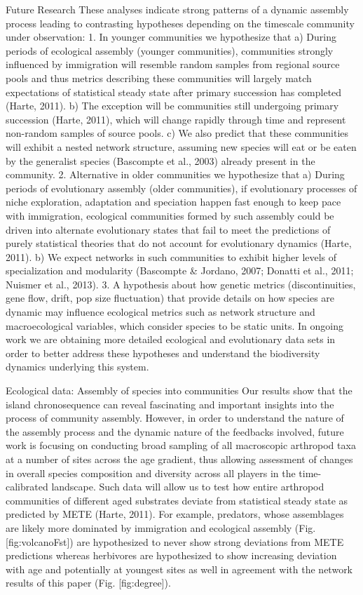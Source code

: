 \documentclass[12pt]{article}
\begin{document}
\begin{linenumbers}
Future Research
These analyses indicate strong patterns of a dynamic assembly process leading to contrasting hypotheses depending on the timescale community under observation: 
1.	In younger communities we hypothesize that
a) During periods of ecological assembly (younger communities), communities strongly influenced by immigration will resemble random samples from regional source pools and thus metrics describing these communities will largely match expectations of statistical steady state after primary succession has completed (Harte, 2011). 
b) The exception will be communities still undergoing primary succession (Harte, 2011), which will change rapidly through time and represent non-random samples of source pools. 
c) We also predict that these communities will exhibit a nested network structure, assuming new species will eat or be eaten by the generalist species (Bascompte et al., 2003) already present in the community.
2.	Alternative in older communities we hypothesize that
a) During periods of evolutionary assembly (older communities), if evolutionary processes of niche exploration, adaptation and speciation happen fast enough to keep pace with immigration, ecological communities formed by such assembly could be driven into alternate evolutionary states that fail to meet the predictions of purely statistical theories that do not account for evolutionary dynamics (Harte, 2011). 
b) We expect networks in such communities to exhibit higher levels of specialization and modularity (Bascompte & Jordano, 2007; Donatti et al., 2011; Nuismer et al., 2013).
3. 	A hypothesis about how genetic metrics (discontinuities, gene flow, drift, pop size fluctuation) that provide details on how species are dynamic may influence ecological metrics such as network structure and macroecological variables, which consider species to be static units.
In ongoing work we are obtaining more detailed ecological and evolutionary data sets in order to better address these hypotheses and understand the biodiversity dynamics underlying this system. 

Ecological data: Assembly of species into communities
Our results show that the island chronosequence can reveal fascinating and important insights into the process of community assembly. However, in order to understand the nature of the assembly process and the dynamic nature of the feedbacks involved, future work is focusing on conducting broad sampling of all macroscopic arthropod taxa at a number of sites across the age gradient, thus allowing assessment of changes in overall species composition and diversity across all players in the time-calibrated landscape.
Such data will allow us to test how entire arthropod communities of different aged substrates deviate from statistical steady state as predicted by METE (Harte, 2011). For example, predators, whose assemblages are likely more dominated by immigration and ecological assembly (Fig. [fig:volcanoFst]) are hypothesized to never show strong deviations from METE  predictions whereas herbivores are hypothesized to show increasing deviation with age and potentially at youngest sites as well in agreement with the network results of this paper (Fig. [fig:degree]).


\end{linenumbers}
\end{document}
